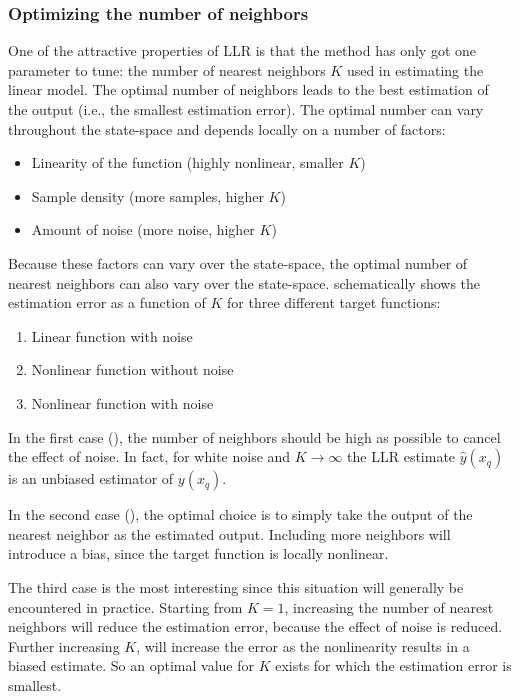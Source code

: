 \subsubsection{Optimizing the number of neighbors}\label{sec:LLR-optimal number of neighbors}
One of the attractive properties of \ac{LLR} is that the method has only got one parameter to tune: the number of nearest neighbors $K$ used in estimating the linear model. The optimal number of neighbors leads to the best estimation of the output (i.e., the smallest estimation error). The optimal number can vary throughout the state-space and depends locally on a number of factors:
\begin{itemize}
	\item Linearity of the function (highly nonlinear, smaller $K$)
	\item Sample density (more samples, higher $K$)
	\item Amount of noise (more noise, higher $K$)
\end{itemize}
Because these factors can vary over the state-space, the optimal number of nearest neighbors can also vary over the state-space.  schematically shows the estimation error as a function of $K$ for three different target functions:
\begin{enumerate}
	\item Linear function with noise
	\item Nonlinear function without noise
	\item Nonlinear function with noise
\end{enumerate}
In the first case (), the number of neighbors should be high as possible to cancel the effect of noise. In fact, for white noise and $K\rightarrow \infty$ the \ac{LLR} estimate $\hat{y}(x_q)$ is an unbiased estimator of $y(x_q)$.

In the second case (), the optimal choice is to simply take the output of the nearest neighbor as the estimated output. Including more neighbors will introduce a bias, since the target function is locally nonlinear.

The third case is the most interesting since this situation will generally be encountered in practice. Starting from $K=1$, increasing the number of nearest neighbors will reduce the estimation error, because the effect of noise is reduced. Further increasing $K$, will increase the error as the nonlinearity results in a biased estimate. So an optimal value for $K$ exists for which the estimation error is smallest.

